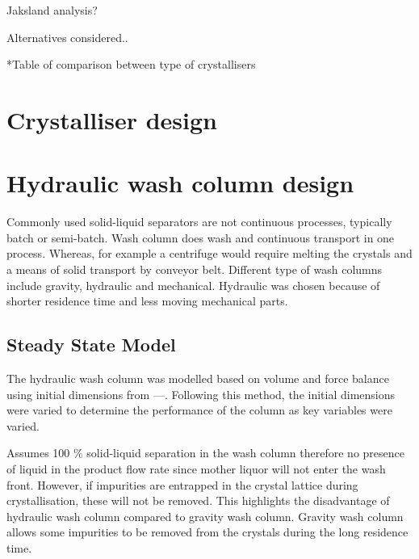 Jaksland analysis?

Alternatives considered..

*Table of comparison between type of crystallisers

 




\section{Crystalliser design}











\section{Hydraulic wash column design}

Commonly used solid-liquid separators are not continuous processes, typically batch or semi-batch. Wash column does wash and continuous transport in one process. Whereas, for example a centrifuge would require  melting the crystals and a means of solid transport by conveyor belt. Different type of wash columns include gravity, hydraulic and mechanical. Hydraulic was chosen because of shorter residence time and less moving mechanical parts. 

\subsection{Steady State Model}
The hydraulic wash column was modelled based on volume and force balance using initial dimensions from ---. Following this method, the initial dimensions were varied to determine the performance of the column as key variables were varied.  

Assumes 100 \% solid-liquid separation in the wash column therefore no presence of liquid in the product flow rate since mother liquor will not enter the wash front. However, if impurities are entrapped in the crystal lattice during crystallisation, these will not be removed. This highlights the disadvantage of hydraulic wash column compared to gravity wash column. Gravity wash column allows some impurities to be removed from the crystals during the long residence time. 

